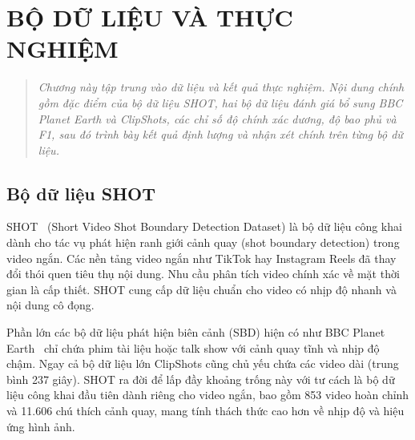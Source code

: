 \chapter{BỘ DỮ LIỆU VÀ THỰC NGHIỆM}
\label{ch:bo_du_lieu_va_thuc_nghiem}

\vspace{-1.5cm} 

\begin{quotation}
    \noindent
    \small\textit{
   Chương này tập trung vào dữ liệu và kết quả thực nghiệm. Nội dung chính gồm đặc điểm của bộ dữ liệu SHOT, hai bộ dữ liệu đánh giá bổ sung BBC Planet Earth và ClipShots, các chỉ số độ chính xác dương, độ bao phủ và F1, sau đó trình bày kết quả định lượng và nhận xét chính trên từng bộ dữ liệu.
    }
\end{quotation}
\vspace{1em} %


\section{Bộ dữ liệu SHOT}
SHOT~\cite{zhu2023autoshot} (Short Video Shot Boundary Detection Dataset) là bộ dữ liệu công khai dành cho tác vụ phát hiện ranh giới cảnh quay (shot boundary detection) trong video ngắn. Các nền tảng video ngắn như TikTok hay Instagram Reels đã thay đổi thói quen tiêu thụ nội dung. Nhu cầu phân tích video chính xác về mặt thời gian là cấp thiết. SHOT cung cấp dữ liệu chuẩn cho video có nhịp độ nhanh và nội dung cô đọng.

Phần lớn các bộ dữ liệu phát hiện biên cảnh (SBD) hiện có như BBC Planet Earth~\cite{baraldi2015rai} chỉ chứa phim tài liệu hoặc talk show với cảnh quay tĩnh và nhịp độ chậm. Ngay cả bộ dữ liệu lớn ClipShots cũng chủ yếu chứa các video dài (trung bình 237 giây). SHOT ra đời để lấp đầy khoảng trống này với tư cách là bộ dữ liệu công khai đầu tiên dành riêng cho video ngắn, bao gồm 853 video hoàn chỉnh và 11.606 chú thích cảnh quay, mang tính thách thức cao hơn về nhịp độ và hiệu ứng hình ảnh.



